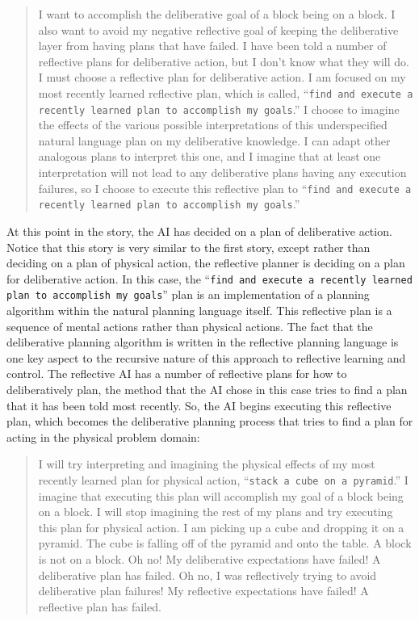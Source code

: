 \begin{quote}
  I want to accomplish the deliberative goal of a block being on a
  block.  I also want to avoid my negative reflective goal of keeping
  the deliberative layer from having plans that have failed.  I have
  been told a number of reflective plans for deliberative action, but
  I don't know what they will do.  I must choose a reflective plan for
  deliberative action.  I am focused on my most recently learned
  reflective plan, which is called, ``{\tt{find and execute a recently
      learned plan to accomplish my goals}}.''  I choose to imagine
  the effects of the various possible interpretations of this
  underspecified natural language plan on my deliberative knowledge.
  I can adapt other analogous plans to interpret this one, and I
  imagine that at least one interpretation will not lead to any
  deliberative plans having any execution failures, so I choose to
  execute this reflective plan to ``{\tt{find and execute a recently
      learned plan to accomplish my goals}}.''
\end{quote}
At this point in the story, the AI has decided on a plan of
deliberative action.  Notice that this story is very similar to the
first story, except rather than deciding on a plan of physical action,
the reflective planner is deciding on a plan for deliberative action.
In this case, the ``{\tt{find and execute a recently learned plan to
    accomplish my goals}}'' plan is an implementation of a planning
algorithm within the natural planning language itself.  This
reflective plan is a sequence of mental actions rather than physical
actions.  The fact that the deliberative planning algorithm is written
in the reflective planning language is one key aspect to the recursive
nature of this approach to reflective learning and control.  The
reflective AI has a number of reflective plans for how to
deliberatively plan, the method that the AI chose in this case tries
to find a plan that it has been told most recently.  So, the AI begins
executing this reflective plan, which becomes the deliberative
planning process that tries to find a plan for acting in the physical
problem domain:
\begin{quote}
  I will try interpreting and imagining the physical effects of my
  most recently learned plan for physical action, ``{\tt{stack a cube
      on a pyramid}}.''  I imagine that executing this plan will
  accomplish my goal of a block being on a block.  I will stop
  imagining the rest of my plans and try executing this plan for
  physical action.  I am picking up a cube and dropping it on a
  pyramid.  The cube is falling off of the pyramid and onto the table.
  A block is not on a block.  Oh no!  My deliberative expectations
  have failed!  A deliberative plan has failed.  Oh no, I was
  reflectively trying to avoid deliberative plan failures!  My
  reflective expectations have failed!  A reflective plan has failed.
\end{quote}
